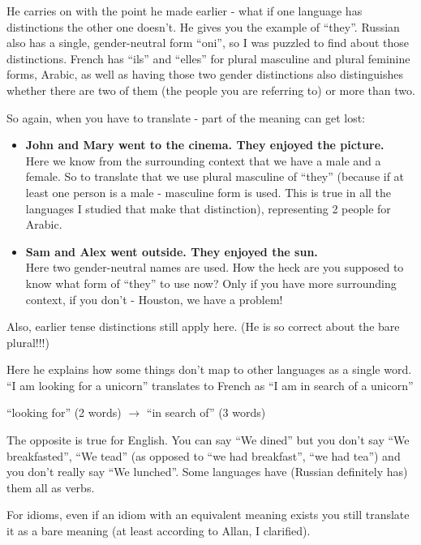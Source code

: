  He carries on with the point he made earlier - what if one language has
distinctions the other one doesn't. He gives you the example of ``they''.
Russian also has a single, gender-neutral form ``oni'', so I was puzzled to find
about those distinctions. French has ``ils'' and ``elles'' for plural masculine 
and plural feminine forms, Arabic, as well as having those two gender 
distinctions also distinguishes whether there are two of them (the people you 
are referring to) or more than two.

So again, when you have to translate - part of the meaning can get lost:

\begin{itemize}
	\item \textbf{John and Mary went to the cinema. They enjoyed the picture.}\\
	Here we know from the surrounding context that we have a male and a female. 
	So to translate that we use plural masculine of ``they'' (because if at 
	least one person is a male - masculine form is used. This is true in all the
	 languages I studied that make that distinction), representing 2 people for 
	 Arabic.
	\item \textbf{Sam and Alex went outside. They enjoyed the sun.} \\Here two 
	gender-neutral names are used. How the heck are you supposed to know what 
	form of ``they'' to use now? Only if you have more surrounding context, if 
	you don't - Houston, we have a problem!
\end{itemize} 

Also, earlier tense distinctions still apply here.
(He is so correct about the bare plural!!!)

 Here he explains how some things don't map to other languages as a single
word. ``I am looking for a unicorn'' translates to French as ``I am in search of
a unicorn''

``looking for'' (2 words) $\rightarrow$ ``in search of'' (3 words)

The opposite is true for English. You can say ``We dined'' but you don't say
``We breakfasted'', ``We tead'' (as opposed to ``we had breakfast'', ``we had
tea'') and you don't really say ``We lunched''. Some languages have (Russian
definitely has) them all as verbs.

For idioms, even if an idiom with an equivalent meaning exists you still
translate it as a bare meaning (at least according to Allan, I clarified).

